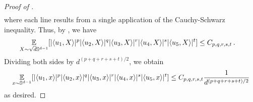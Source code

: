 \begin{proof}[Proof of ]
\begin{align}
\end{align}
where each line results from a single application of the Cauchy-Schwarz inequality. Thus, by , we have
\begin{align}
\operatorname*{\mathbb{E}}_{X \sim \sqrt{d}\mathbb{S}^{d - 1}} [|\langle u_1, X \rangle|^p |\langle u_2, X \rangle|^q |\langle u_3, X \rangle|^r |\langle u_4, X \rangle|^s |\langle u_5, X \rangle|^t] 
& \leq C_{p, q, r, s, t} \,.
\end{align}
Dividing both sides by $d^{(p + q + r + s + t)/2}$, we obtain
\begin{align}
\operatorname*{\mathbb{E}}_{x \sim \mathbb{S}^{d - 1}} [|\langle u_1, x \rangle|^p |\langle u_2, x \rangle|^q |\langle u_3, x \rangle|^r |\langle u_4, x \rangle|^s |\langle u_5, x \rangle|^t] \leq C_{p, q, r, s, t} \frac{1}{d^{(p + q + r + s + t)/2}}
\end{align}
as desired.
\end{proof}